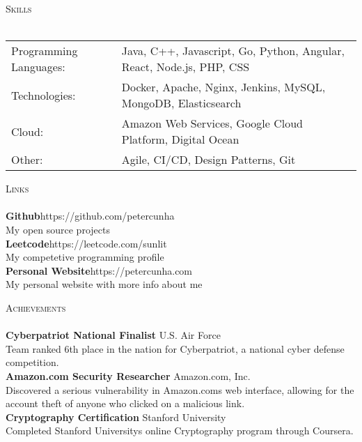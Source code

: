 \documentclass[a4paper]{article}
\newcommand{\lineunder} {
    \vspace*{-8pt} \\
    \hspace*{-18pt} \hrulefill \\
}
\newcommand{\header} [1] {
    {\hspace*{-18pt}\vspace*{6pt} \textsc{#1}}
    \vspace*{-6pt} \lineunder
}
\begin{document}
\header{Skills}
\begin{tabular}{ l l }
	Programming Languages: & Java, C++, Javascript, Go, Python, Angular, React, Node.js, PHP, CSS \\
	Technologies:          & Docker, Apache, Nginx, Jenkins, MySQL, MongoDB, Elasticsearch        \\
	Cloud:                 & Amazon Web Services, Google Cloud Platform, Digital Ocean            \\
	Other:                 & Agile, CI/CD, Design Patterns, Git                                   \\
\end{tabular}
\vspace{2mm}

\header{Links}
{\textbf{Github}}\hfill https://github.com/petercunha\\
My open source projects\\
\vspace*{2mm}
{\textbf{Leetcode}}\hfill https://leetcode.com/sunlit\\
My competetive programming profile\\
\vspace*{2mm}
{\textbf{Personal Website}}\hfill https://petercunha.com\\
My personal website with more info about me\\
\vspace*{2mm}

\header{Achievements}
\textbf{Cyberpatriot National Finalist} \hfill U.S. Air Force\\
Team ranked 6th place in the nation for Cyberpatriot, a national cyber defense competition.\\
\vspace*{2mm}
\textbf{Amazon.com Security Researcher} \hfill Amazon.com, Inc.\\
Discovered a serious vulnerability in Amazon.com\textquotesingle{}s web interface, allowing for the account theft of anyone who clicked on a malicious link.\\
\vspace*{2mm}
\textbf{Cryptography Certification} \hfill Stanford University\\
Completed Stanford University\textquotesingle{}s online Cryptography program through Coursera.\\
\vspace*{2mm}

\ 
\end{document}
